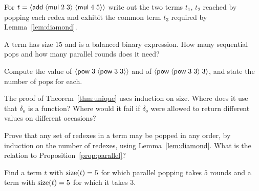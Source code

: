 \begin{exercise}[\dag]\label{ex:ch4-diamond}
For $t=\langle \mathsf{add}\; \langle \mathsf{mul}\; 2\; 3\rangle\; \langle \mathsf{mul}\; 4\; 5\rangle\rangle$ write out the two terms $t_1$, $t_2$ reached by popping each redex and exhibit the common term $t_3$ required by Lemma~\ref{lem:diamond}.
\end{exercise}

\begin{exercise}[\dag]\label{ex:ch4-rounds}
A term has size $15$ and is a balanced binary expression. How many sequential pops and how many parallel rounds does it need?
\end{exercise}

\begin{exercise}[\dag]\label{ex:ch4-tower}
Compute the value of $\langle \mathsf{pow}\; 3\; \langle \mathsf{pow}\; 3\; 3\rangle\rangle$ and of $\langle \mathsf{pow}\; \langle \mathsf{pow}\; 3\; 3\rangle\; 3\rangle$, and state the number of pops for each.
\end{exercise}

\begin{exercise}
The proof of Theorem~\ref{thm:unique} uses induction on size. Where does it use that $\delta_o$ is a function? Where would it fail if $\delta_o$ were allowed to return different values on different occasions?
\end{exercise}

\begin{exercise}
Prove that any set of redexes in a term may be popped in any order, by induction on the number of redexes, using Lemma~\ref{lem:diamond}. What is the relation to Proposition~\ref{prop:parallel}?
\end{exercise}

\begin{exercise}
Find a term $t$ with $\operatorname{size}(t)=5$ for which parallel popping takes $5$ rounds and a term with $\operatorname{size}(t)=5$ for which it takes $3$.
\end{exercise}
